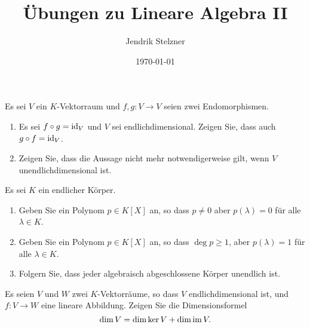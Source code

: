 \documentclass[a4paper,10pt]{scrartcl}
\title{Übungen zu Lineare Algebra II}
\author{Jendrik Stelzner}
\date{\today}
\begin{document}
\maketitle

















\begin{question}
  Es sei $V$ ein $K$-Vektorraum und $f, g \colon V \to V$ seien zwei Endomorphismen.
  \begin{enumerate}[leftmargin=*]
    \item
      Es sei $f \circ g = \operatorname{id}_V$ und $V$ sei endlichdimensional.
      Zeigen Sie, dass auch $g \circ f = \operatorname{id}_V$.
    \item
      Zeigen Sie, dass die Aussage nicht mehr notwendigerweise gilt, wenn $V$ unendlichdimensional ist.
  \end{enumerate}
\end{question}


\begin{question}
  Es sei $K$ ein endlicher Körper.
  \begin{enumerate}[leftmargin=*]
    \item
      Geben Sie ein Polynom $p \in K[X]$ an, so dass $p \neq 0$ aber $p(\lambda) = 0$ für alle $\lambda \in K$.
    \item
      Geben Sie ein Polynom $p \in K[X]$ an, so dass $\deg p \geq 1$, aber $p(\lambda) = 1$ für alle $\lambda \in K$.
    \item
      Folgern Sie, dass jeder algebraisch abgeschlossene Körper unendlich ist.
  \end{enumerate}
\end{question}


\begin{question}
  Es seien $V$ und $W$ zwei $K$-Vektorräume, so dass $V$ endlichdimensional ist, und $f \colon V \to W$ eine lineare Abbildung.
  Zeigen Sie die Dimensionsformel
  \[
    \dim V = \dim \ker V + \dim \operatorname{im} V.
  \]
\end{question}
\end{document}

